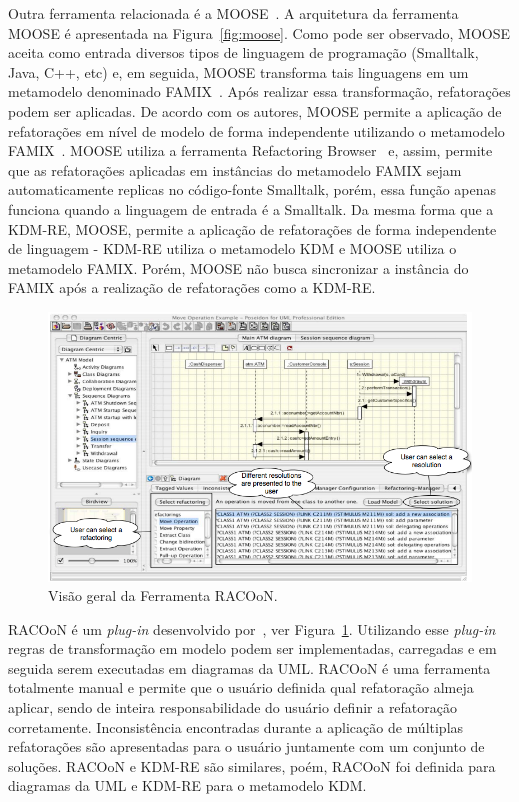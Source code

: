 Outra ferramenta relacionada é a MOOSE~\cite{tichelaar2000meta, ducasse2000moose}. A arquitetura da ferramenta MOOSE é apresentada na Figura~\ref{fig:moose}. Como pode ser observado, MOOSE aceita como entrada diversos tipos de linguagem de programação (Smalltalk, Java, C++, etc) e, em seguida, MOOSE transforma tais linguagens em um metamodelo denominado FAMIX~\cite{tichelaar2000meta}. Após realizar essa transformação, refatorações podem ser aplicadas. De acordo com os autores, MOOSE permite a aplicação de refatorações em nível de modelo de forma independente utilizando o metamodelo FAMIX~\cite{tichelaar2000meta}. MOOSE utiliza a ferramenta Refactoring Browser~\cite{roberts1997refactoring} e, assim, permite que as refatorações aplicadas em instâncias do metamodelo FAMIX sejam automaticamente replicas no código-fonte Smalltalk, porém, essa função apenas funciona quando a linguagem de entrada é a Smalltalk. Da mesma forma que a KDM-RE, MOOSE, permite a aplicação de refatorações de forma independente de linguagem - KDM-RE utiliza o metamodelo KDM e MOOSE utiliza o metamodelo FAMIX. Porém, MOOSE não busca sincronizar a instância do FAMIX após a realização de refatorações como a KDM-RE.

\begin{figure}[h]
	\centering
	\caption{Visão geral da Ferramenta RACOoN.}
	\label{fig:racoon}
	\includegraphics[scale=0.52]{images/fig_racoon}
\end{figure}

RACOoN é um \textit{plug-in} desenvolvido por~, ver Figura~\ref{fig:racoon}. Utilizando esse \textit{plug-in} regras de transformação em modelo podem ser implementadas, carregadas e em seguida serem executadas em diagramas da UML. RACOoN é uma ferramenta totalmente manual e permite que o usuário definida qual refatoração almeja aplicar, sendo de inteira responsabilidade do usuário definir a refatoração corretamente. Inconsistência encontradas durante a aplicação de múltiplas refatorações são apresentadas para o usuário juntamente com um conjunto de soluções. RACOoN e KDM-RE são similares, poém, RACOoN foi definida para diagramas da UML e KDM-RE para o metamodelo KDM.


